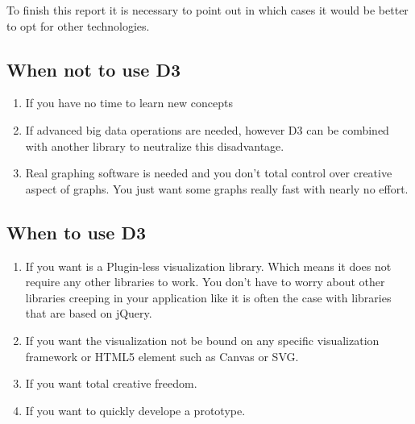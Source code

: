 \documentclass{bioinfo}
\begin{document}
To finish this report it is necessary to point out in which cases it would be better to opt for other technologies.

\subsection{When not to use D3}
\begin{enumerate}
\item If you have no time to learn new concepts
\item If advanced big data operations are needed, however D3 can be combined with another library to neutralize this disadvantage.
\item Real graphing software is needed and you don't total control over creative aspect of graphs. You just want some graphs really fast with nearly no effort. 
\end{enumerate}

\subsection{When to use D3}
\begin{enumerate}
\item If you want is a Plugin-less visualization library. Which means it does not require any other libraries to work. You don't have to worry about other libraries creeping in your application like it is often the case with libraries that are based on jQuery.
\item If you want the visualization not be bound on any specific visualization framework or HTML5 element such as Canvas or SVG.
\item If you want total creative freedom.
\item If you want to quickly develope a prototype.
\end{enumerate}
\end{document}
